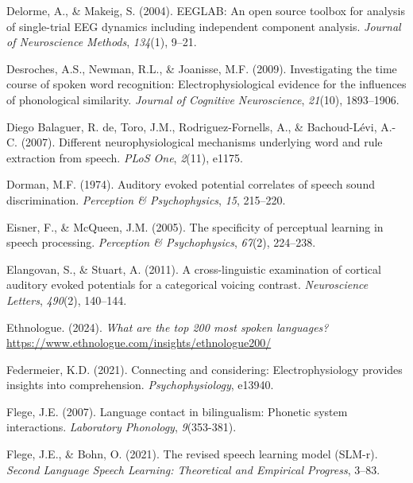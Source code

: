 \documentclass[
  12pt,
  twoside]{article}
\newlength{\cslhangindent}
\newlength{\cslentryspacingunit} %
\newenvironment{CSLReferences}[2] %
 {%
  \setlength{\parindent}{0pt}
  \ifodd #1
  \let\oldpar\par
  \def\par{\hangindent=\cslhangindent\oldpar}
  \fi
  \setlength{\parskip}{#2\cslentryspacingunit}
 }%
 {}
\begin{document}
\begin{CSLReferences}{1}{0}
\leavevmode{}%
Delorme, A., \& Makeig, S. (2004). {EEGLAB}: An open source toolbox for analysis of single-trial {EEG} dynamics including independent component analysis. \emph{Journal of Neuroscience Methods}, \emph{134}(1), 9--21.

\leavevmode{}%
Desroches, A.S., Newman, R.L., \& Joanisse, M.F. (2009). Investigating the time course of spoken word recognition: Electrophysiological evidence for the influences of phonological similarity. \emph{Journal of Cognitive Neuroscience}, \emph{21}(10), 1893--1906.

\leavevmode{}%
Diego Balaguer, R. de, Toro, J.M., Rodriguez-Fornells, A., \& Bachoud-Lévi, A.-C. (2007). Different neurophysiological mechanisms underlying word and rule extraction from speech. \emph{PLoS One}, \emph{2}(11), e1175.

\leavevmode{}%
Dorman, M.F. (1974). Auditory evoked potential correlates of speech sound discrimination. \emph{Perception \& Psychophysics}, \emph{15}, 215--220.

\leavevmode{}%
Eisner, F., \& McQueen, J.M. (2005). The specificity of perceptual learning in speech processing. \emph{Perception \& Psychophysics}, \emph{67}(2), 224--238.

\leavevmode{}%
Elangovan, S., \& Stuart, A. (2011). A cross-linguistic examination of cortical auditory evoked potentials for a categorical voicing contrast. \emph{Neuroscience Letters}, \emph{490}(2), 140--144.

\leavevmode{}%
Ethnologue. (2024). \emph{What are the top 200 most spoken languages?} \url{https://www.ethnologue.com/insights/ethnologue200/}

\leavevmode{}%
Federmeier, K.D. (2021). Connecting and considering: Electrophysiology provides insights into comprehension. \emph{Psychophysiology}, e13940.

\leavevmode{}%
Flege, J.E. (2007). Language contact in bilingualism: Phonetic system interactions. \emph{Laboratory Phonology}, \emph{9}(353-381).

\leavevmode{}%
Flege, J.E., \& Bohn, O. (2021). The revised speech learning model (SLM-r). \emph{Second Language Speech Learning: Theoretical and Empirical Progress}, 3--83.


\end{CSLReferences}
\end{document}
